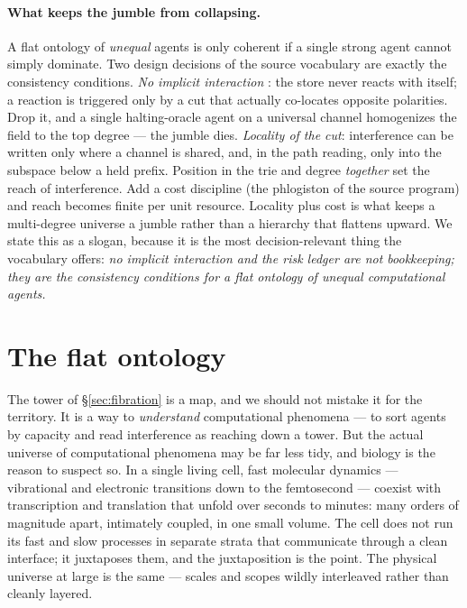 \paragraph{What keeps the jumble from collapsing.}
A flat ontology of \emph{unequal} agents is only coherent if a single strong agent
cannot simply dominate. Two design decisions of the source vocabulary are exactly
the consistency conditions. \emph{No implicit interaction} \cite{paths}: the store
never reacts with itself; a reaction is triggered only by a cut that actually
co-locates opposite polarities. Drop it, and a single halting-oracle agent on a
universal channel homogenizes the field to the top degree --- the jumble dies.
\emph{Locality of the cut}: interference can be written only where a channel is
shared, and, in the path reading, only into the subspace below a held prefix.
Position in the trie and degree \emph{together} set the reach of interference. Add
a cost discipline (the phlogiston of the source program) and reach becomes finite
per unit resource. Locality plus cost is what keeps a multi-degree universe a
jumble rather than a hierarchy that flattens upward. We state this as a slogan,
because it is the most decision-relevant thing the vocabulary offers: \emph{no
implicit interaction and the risk ledger are not bookkeeping; they are the
consistency conditions for a flat ontology of unequal computational agents.}


\section{The flat ontology}\label{ndo:sec:flat}

The tower of \S\ref{sec:fibration} is a map, and we should not mistake it for the
territory. It is a way to \emph{understand} computational phenomena --- to sort agents
by capacity and read interference as reaching down a tower. But the actual universe of
computational phenomena may be far less tidy, and biology is the reason to suspect so.
In a single living cell, fast molecular dynamics --- vibrational and electronic
transitions down to the femtosecond --- coexist with transcription and translation
that unfold over seconds to minutes: many orders of magnitude apart, intimately
coupled, in one small volume. The cell does not run its fast and slow processes in
separate strata that communicate through a clean interface; it juxtaposes them, and the
juxtaposition is the point. The physical universe at large is the same --- scales and
scopes wildly interleaved rather than cleanly layered.

